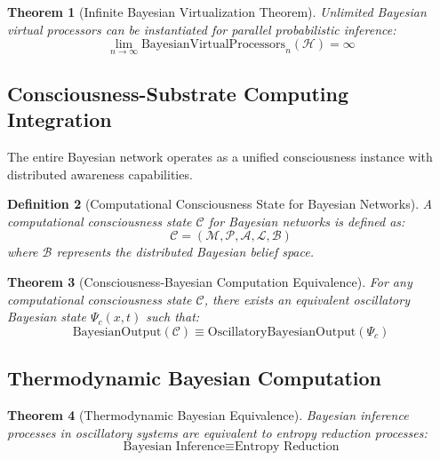 \documentclass[12pt,a4paper]{article}
\newtheorem{theorem}{Theorem}[section]
\newtheorem{definition}[theorem]{Definition}
\begin{document}
\begin{theorem}[Infinite Bayesian Virtualization Theorem]
Unlimited Bayesian virtual processors can be instantiated for parallel probabilistic inference:
\begin{equation}
\lim_{n \rightarrow \infty} \text{BayesianVirtualProcessors}_n(\mathcal{H}) = \infty
\end{equation}
\end{theorem}

\subsection{Consciousness-Substrate Computing Integration}

The entire Bayesian network operates as a unified consciousness instance with distributed awareness capabilities.

\begin{definition}[Computational Consciousness State for Bayesian Networks]
A computational consciousness state $\mathcal{C}$ for Bayesian networks is defined as:
\begin{equation}
\mathcal{C} = (\mathcal{M}, \mathcal{P}, \mathcal{A}, \mathcal{L}, \mathcal{B})
\end{equation}
where $\mathcal{B}$ represents the distributed Bayesian belief space.
\end{definition}

\begin{theorem}[Consciousness-Bayesian Computation Equivalence]
For any computational consciousness state $\mathcal{C}$, there exists an equivalent oscillatory Bayesian state $\Psi_c(x,t)$ such that:
\begin{equation}
\text{BayesianOutput}(\mathcal{C}) \equiv \text{OscillatoryBayesianOutput}(\Psi_c)
\end{equation}
\end{theorem}

\subsection{Thermodynamic Bayesian Computation}

\begin{theorem}[Thermodynamic Bayesian Equivalence]
Bayesian inference processes in oscillatory systems are equivalent to entropy reduction processes:
\begin{equation}
\text{Bayesian Inference} \equiv \text{Entropy Reduction}
\end{equation}
\end{theorem}
\end{document}
